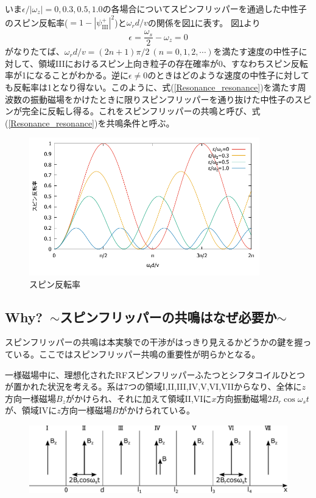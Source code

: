 いま$\epsilon/|\omega_z|=0,0.3,0.5,1.0$の各場合についてスピンフリッパーを通過した中性子のスピン反転率($=1-|\psi_\mathrm{III}^+|^2$)と$\omega_r d/v$の関係を図\ref{Resonance_fig_reversalrate}に表す。
図\ref{Resonance_fig_reversalrate}より
\begin{equation}
\epsilon=\frac{\omega_s}{2}-\omega_z=0 \label{Resonance_resonance}
\end{equation}
がなりたてば、$\omega_r d/v =(2n+1)\pi/2 \ (n =0,1,2,\cdots)$を満たす速度の中性子に対して、領域IIIにおけるスピン上向き粒子の存在確率が0、すなわちスピン反転率が1になることがわかる。逆に$\epsilon \neq 0$のときはどのような速度の中性子に対しても反転率は1となり得ない。このように、式(\ref{Resonance_resonance})を満たす周波数の振動磁場をかけたときに限りスピンフリッパーを通り抜けた中性子のスピンが完全に反転し得る。これをスピンフリッパーの共鳴と呼び、式(\ref{Resonance_resonance})を共鳴条件と呼ぶ。
\begin{figure}[h]
\begin{center}
\includegraphics[width=10cm]{resonance/whatwhyhow/resonance_reversalrate.pdf}
\caption{スピン反転率}
\label{Resonance_fig_reversalrate}
\end{center}
\end{figure}

\subsection{Why?\ $\sim$スピンフリッパーの共鳴はなぜ必要か$\sim$}
スピンフリッパーの共鳴は本実験での干渉がはっきり見えるかどうかの鍵を握っている。ここではスピンフリッパー共鳴の重要性が明らかとなる。

一様磁場中に、理想化されたRFスピンフリッパーふたつとシフタコイルひとつが置かれた状況を考える。系は7つの領域I,II,III,IV,V,VI,VIIからなり、全体に$z$方向一様磁場$B_z$がかけられ、それに加えて領域II,VIに$x$方向振動磁場$2B_r\cos\omega_s t$が、領域IVに$z$方向一様磁場$B$がかけられている。
\begin{figure}[h]
\centering
\includegraphics[height=3cm]{resonance/whatwhyhow/Resonance_why_setting.pdf}
\end{figure}

